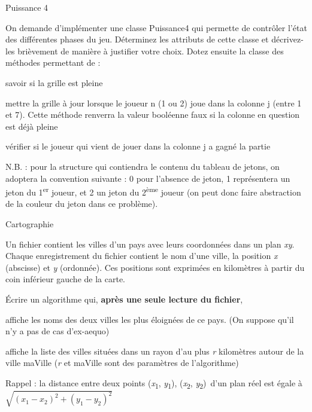 \begin{Exercice}{Puissance 4}
	
	On demande d’implémenter une classe Puissance4 qui permette de contrôler
	l’état des différentes phases du jeu. Déterminez les attributs de cette
	classe et décrivez-les brièvement de manière à justifier votre choix.
	Dotez ensuite la classe des méthodes permettant de :

	\begin{liste}
		\item 
			savoir si la grille est pleine
		\item 
			mettre la grille à jour lorsque le joueur n (1 ou 2) joue dans la
			colonne j (entre 1 et 7). Cette méthode renverra la valeur booléenne
			faux si la colonne en question est déjà pleine
		\item 
			vérifier si le joueur qui vient de jouer dans la colonne j a gagné la
			partie
	\end{liste}
	
	N.B. : pour la structure qui contiendra le contenu du tableau de jetons,
	on adoptera la convention suivante : 0 pour l’absence de jeton, 1
	représentera un jeton du 1\textsuperscript{er} joueur, et 2 un jeton du
	2\textsuperscript{ème} joueur (on peut donc faire abstraction de la
	couleur du jeton dans ce problème).
\end{Exercice}

\begin{Exercice}{Cartographie}

	Un fichier  contient les villes d’un pays avec
	leurs coordonnées dans un plan
	\textit{xy}. Chaque
	enregistrement du fichier contient le nom d’une ville, la position
	\textit{x} (abscisse) et
	\textit{y} (ordonnée). Ces
	positions sont exprimées en kilomètres à partir du coin inférieur
	gauche de la carte.

	Écrire un algorithme qui,
	\textbf{après une seule lecture du
	fichier}, 

	\begin{liste}
		\item
			affiche les noms des deux villes les plus éloignées de ce pays. (On
			suppose qu’il n’y a pas de cas d’ex-aequo)
		\item 
			affiche la liste des villes situées dans un rayon d’au
			plus \textit{r} kilomètres autour
			de la ville maVille
			(\textit{r} et maVille sont des
			paramètres de l’algorithme)
	\end{liste}
	
	Rappel : la distance entre deux
	points
	(\textit{x}\textsubscript{1},
	\textit{y}\textsubscript{1}),
	(\textit{x}\textsubscript{2},
	\textit{y}\textsubscript{2})~d’un
	plan réel est égale à
	\\
	\begin{math}
		\sqrt{{(x_1 - x_2)}^2 + {(y_1 - y_2)}^2}
	\end{math}
\end{Exercice}

